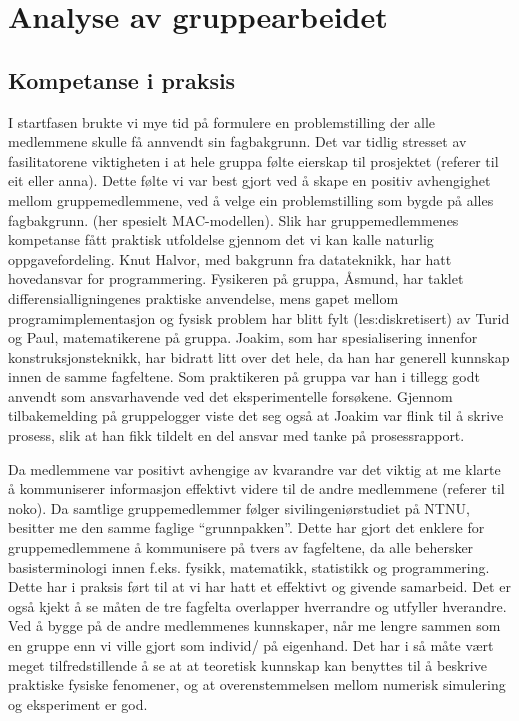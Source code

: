 
\chapter{Analyse av gruppearbeidet}

\section{Kompetanse i praksis}

I startfasen brukte vi mye tid på formulere en problemstilling der alle 
medlemmene skulle få annvendt sin fagbakgrunn. Det var tidlig stresset av fasilitatorene
viktigheten i at hele gruppa følte eierskap til prosjektet (referer til eit eller anna).
Dette følte vi var best gjort ved å skape en positiv avhengighet mellom gruppemedlemmene,
ved å velge ein problemstilling som bygde på alles fagbakgrunn. (her spesielt MAC-modellen).
Slik har gruppemedlemmenes kompetanse fått praktisk utfoldelse gjennom det vi
kan kalle naturlig oppgavefordeling. Knut Halvor, med bakgrunn fra
datateknikk, har hatt hovedansvar for programmering.
Fysikeren på gruppa, Åsmund, har taklet differensialligningenes praktiske anvendelse, mens gapet
mellom programimplementasjon og fysisk problem har blitt fylt (les:diskretisert) av Turid og Paul,
matematikerene på gruppa. Joakim, som har spesialisering innenfor konstruksjonsteknikk, har bidratt litt over det hele, da
han har generell kunnskap innen de samme fagfeltene. Som praktikeren på gruppa var han i tillegg godt anvendt 
som ansvarhavende ved det eksperimentelle forsøkene. Gjennom tilbakemelding på
gruppelogger viste det seg også at Joakim var flink til å skrive prosess, slik
at han fikk tildelt en del ansvar med tanke på prosessrapport.

Da medlemmene var positivt avhengige av kvarandre var det viktig at me klarte å
kommuniserer informasjon effektivt videre til de andre medlemmene (referer til noko).
Da samtlige gruppemedlemmer følger sivilingeniørstudiet på NTNU, besitter me den samme
faglige ``grunnpakken''. Dette har gjort det enklere for gruppemedlemmene å kommunisere på 
tvers av fagfeltene, da alle behersker basisterminologi innen f.eks. fysikk, matematikk, 
statistikk og programmering. Dette har i praksis ført til at vi har hatt et effektivt
og givende samarbeid. Det er også kjekt å se måten de tre fagfelta overlapper hverrandre og
utfyller hverandre. Ved å bygge på de andre medlemmenes kunnskaper, når me lengre sammen som 
en gruppe enn vi ville gjort som individ/ på eigenhand.
Det har i så måte vært meget tilfredstillende å se at at teoretisk kunnskap kan
benyttes til å beskrive praktiske fysiske fenomener, og at overenstemmelsen
mellom numerisk simulering og eksperiment er god. 



